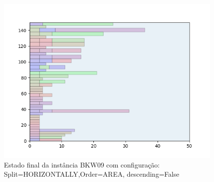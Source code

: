 \begin{figure}[H]
    \centering
    \caption[]{Estado final da instância BKW09 com configuração: Split=HORIZONTALLY,Order=AREA, descending=False}
    \label{fig:bkw09-horizontally-area-false}
    \includegraphics[scale=0.5]{output/figures/bkw/bkw09/horizontally/area/false/000}
\end{figure}